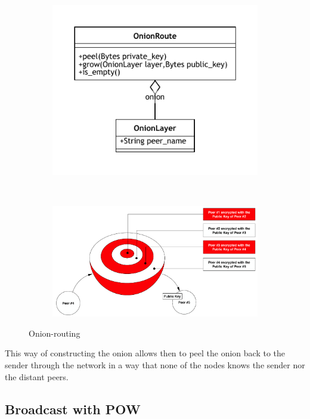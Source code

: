 \documentclass{article}
\begin{document}
\begin{figure}[t!]
    \centering 
    \begin{subfigure}[t]{0.3\textwidth}
		\centering
		\includegraphics[scale=1.0]{OnionRoute.pdf}
	\end{subfigure}%
    ~ 
    \begin{subfigure}[t]{0.7\textwidth}
		\centering
		\includegraphics[scale=0.35]{onion.pdf}
	\end{subfigure}
    \caption{Onion-routing}
	\label{fig:fr:onionrouting}
\end{figure}


This way of constructing the onion allows then to peel the onion back to the sender through the network in a way that none of the nodes knows the sender nor the distant peers.

\subsection{Broadcast with POW} 
\end{document}
